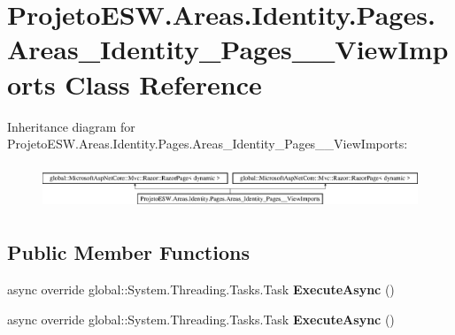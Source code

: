 \hypertarget{class_projeto_e_s_w_1_1_areas_1_1_identity_1_1_pages_1_1_areas___identity___pages_____view_imports}{}\section{Projeto\+E\+S\+W.\+Areas.\+Identity.\+Pages.\+Areas\+\_\+\+Identity\+\_\+\+Pages\+\_\+\+\_\+\+View\+Imports Class Reference}
\label{class_projeto_e_s_w_1_1_areas_1_1_identity_1_1_pages_1_1_areas___identity___pages_____view_imports}
Inheritance diagram for Projeto\+E\+S\+W.\+Areas.\+Identity.\+Pages.\+Areas\+\_\+\+Identity\+\_\+\+Pages\+\_\+\+\_\+\+View\+Imports\+:\begin{figure}[H]
\begin{center}
\leavevmode
\includegraphics[height=1.342926cm]{class_projeto_e_s_w_1_1_areas_1_1_identity_1_1_pages_1_1_areas___identity___pages_____view_imports}
\end{center}
\end{figure}
\subsection*{Public Member Functions}
\begin{DoxyCompactItemize}
\item 
\mbox{\label{class_projeto_e_s_w_1_1_areas_1_1_identity_1_1_pages_1_1_areas___identity___pages_____view_imports_aea0fd3dfe94f06c3325a5c3660928d3b}} 
async override global\+::\+System.\+Threading.\+Tasks.\+Task {\bfseries Execute\+Async} ()
\item 
\mbox{\label{class_projeto_e_s_w_1_1_areas_1_1_identity_1_1_pages_1_1_areas___identity___pages_____view_imports_aea0fd3dfe94f06c3325a5c3660928d3b}} 
async override global\+::\+System.\+Threading.\+Tasks.\+Task {\bfseries Execute\+Async} ()
\end{DoxyCompactItemize}
